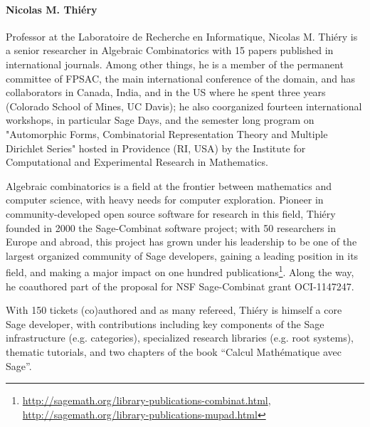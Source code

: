 \paragraph{Nicolas M. Thiéry}


Professor at the Laboratoire de Recherche en Informatique, Nicolas
M. Thiéry is a senior researcher in Algebraic Combinatorics with 15
papers published in international journals. Among other things, he is
a member of the permanent committee of FPSAC, the main international
conference of the domain, and has collaborators in Canada, India, and
in the US where he spent three years (Colorado School of Mines, UC
Davis); he also coorganized fourteen international workshops, in
particular Sage Days, and the semester long program on "Automorphic
Forms, Combinatorial Representation Theory and Multiple Dirichlet
Series" hosted in Providence (RI, USA) by the Institute for
Computational and Experimental Research in Mathematics.

Algebraic combinatorics is a field at the frontier between mathematics
and computer science, with heavy needs for computer
exploration. Pioneer in community-developed open source software for
research in this field, Thiéry founded in 2000 the Sage-Combinat
software project; with 50 researchers in Europe and abroad, this
project has grown under his leadership to be one of the largest
organized community of Sage developers, gaining a leading position in
its field, and making a major impact on one hundred
publications\footnote{\url{http://sagemath.org/library-publications-combinat.html},
\url{http://sagemath.org/library-publications-mupad.html}}. Along the
way,
he coauthored part of the proposal for NSF Sage-Combinat grant
OCI-1147247.

With 150 tickets (co)authored and as many refereed, Thiéry is himself
a core Sage developer, with contributions including key components of
the Sage infrastructure (e.g. categories), specialized research
libraries (e.g. root systems), thematic tutorials, and two chapters of
the book ``Calcul Mathématique avec Sage''.
